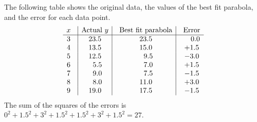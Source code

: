 \begin{solution}
\begin{center}
  \end{center}
  The following table shows the original data, the values of the
  best fit parabola, and the error for each data point.
  \begin{equation*}
    \begin{array}{c@{~~~}|c|@{~~~}c|@{~~~}c}
      x & \mbox{Actual $y$} & \mbox{Best fit parabola} & \mbox{Error} \\\hline
      3 &  23.5 &  23.5 & ~~~0.0 \\
      4 &  13.5 &  15.0 &   +1.5 \\
      5 &  12.5 & ~~9.5 &   -3.0 \\
      6 & ~~5.5 & ~~7.0 &   +1.5 \\
      7 & ~~9.0 & ~~7.5 &   -1.5 \\
      8 & ~~8.0 &  11.0 &   +3.0 \\
      9 &  19.0 &  17.5 &   -1.5 \\
    \end{array}
  \end{equation*}
  The sum of the squares of the errors is $0^2 + 1.5^2 + 3^2 + 1.5^2 + 1.5^2 + 3^2 + 1.5^2 = 27$.
\end{solution}
